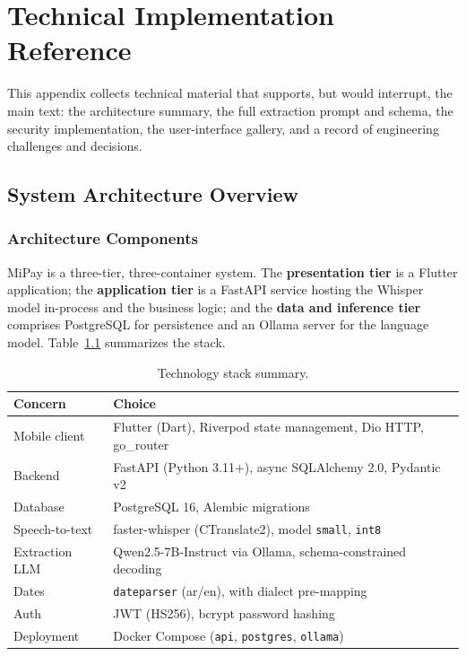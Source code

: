 \appendix

\chapter{Technical Implementation Reference}

\setlength{\parindent}{1em}

This appendix collects technical material that supports, but would interrupt, the
main text: the architecture summary, the full extraction prompt and schema, the
security implementation, the user-interface gallery, and a record of engineering
challenges and decisions.

\section{System Architecture Overview}

\subsection{Architecture Components}

MiPay is a three-tier, three-container system. The \textbf{presentation tier} is a
Flutter application; the \textbf{application tier} is a FastAPI service hosting the
Whisper model in-process and the business logic; and the \textbf{data and
inference tier} comprises PostgreSQL for persistence and an Ollama server for the
language model. Table~\ref{tab:stack-summary} summarizes the stack.

\begin{table}[H]
\centering
\caption{Technology stack summary.}
\label{tab:stack-summary}
\small
\renewcommand{\arraystretch}{1.25}
\begin{tabularx}{\textwidth}{l X}
\toprule
\textbf{Concern} & \textbf{Choice} \\
\midrule
Mobile client & Flutter (Dart), Riverpod state management, Dio HTTP, go\_router \\
Backend & FastAPI (Python 3.11+), async SQLAlchemy 2.0, Pydantic v2 \\
Database & PostgreSQL 16, Alembic migrations \\
Speech-to-text & faster-whisper (CTranslate2), model \texttt{small}, \texttt{int8} \\
Extraction LLM & Qwen2.5-7B-Instruct via Ollama, schema-constrained decoding \\
Dates & \texttt{dateparser} (ar/en), with dialect pre-mapping \\
Auth & JWT (HS256), bcrypt password hashing \\
Deployment & Docker Compose (\texttt{api}, \texttt{postgres}, \texttt{ollama}) \\
\bottomrule
\end{tabularx}
\end{table}

